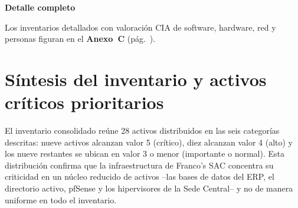\documentclass[11pt, a4paper, oneside]{report}
\newenvironment{notabox}[1]{%
  \begin{lrbox}{\notaboxsb}%
  \begin{minipage}{\dimexpr\textwidth-2\fboxsep\relax}%
  \vspace{4pt}\textcolor{upeu_dark}{\textbf{#1}}\\[2pt]\small%
}{%
  \vspace{4pt}%
  \end{minipage}%
  \end{lrbox}%
  \vspace{6pt}\par\noindent\colorbox{upeu_light}{\usebox{\notaboxsb}}\par\vspace{6pt}%
}
\begin{document}
\begin{notabox}{Detalle completo}
Los inventarios detallados con valoración CIA de software, hardware, red y personas figuran en el \textbf{Anexo~C} (pág.~\pageref{anex:activos_secundarios}).
\end{notabox}
\section{Síntesis del inventario y activos críticos prioritarios}

El inventario consolidado reúne 28 activos distribuidos en las seis categorías descritas: nueve activos alcanzan valor 5 (crítico), diez alcanzan valor 4 (alto) y los nueve restantes se ubican en valor 3 o menor (importante o normal). Esta distribución confirma que la infraestructura de Franco's SAC concentra su criticidad en un núcleo reducido de activos --las bases de datos del ERP, el directorio activo, pfSense y los hipervisores de la Sede Central-- y no de manera uniforme en todo el inventario.

\renewcommand{\arraystretch}{1.3}
\footnotesize
{}
\end{document}
